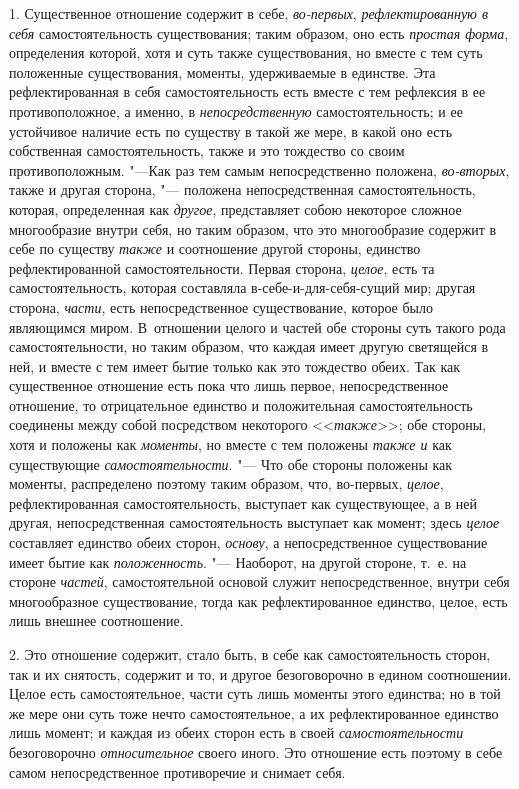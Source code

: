 1. Существенное отношение содержит в себе, {\em во-первых},
{\em рефлектированную в себя} самостоятельность
существования; таким образом, оно есть {\em простая
форма}, определения которой, хотя и суть также существования, но вместе с
тем суть положенные существования, моменты, удерживаемые в единстве. Эта
рефлектированная в себя самостоятельность есть вместе с тем рефлексия в ее
противоположное, а именно, в {\em непосредственную}
самостоятельность; и ее устойчивое наличие есть по существу в такой же
мере, в какой оно есть собственная самостоятельность, также и это тождество
со своим противоположным. "---Как раз тем самым непосредственно положена,
{\em во-вторых}, также и другая сторона, "--- положена
непосредственная самостоятельность, которая, определенная как
{\em другое}, представляет собою некоторое сложное
многообразие внутри себя, но таким образом, что это многообразие содержит в
себе по существу {\em также} и соотношение другой
стороны, единство рефлектированной самостоятельности. Первая сторона,
{\em целое}, есть та самостоятельность, которая
составляла в-себе-и-для-себя-сущий мир; другая сторона,
{\em части}, есть непосредственное существование,
которое было являющимся миром. В~отношении целого и частей обе стороны суть
такого рода самостоятельности, но таким образом, что каждая имеет другую
светящейся в ней, и вместе с тем имеет бытие только как это тождество
обеих. Так как существенное отношение есть пока что лишь первое,
непосредственное отношение, то отрицательное единство и положительная
самостоятельность соединены между собой посредством некоторого
<<{\em также}>>; обе стороны, хотя и положены как
{\em моменты}, но вместе с тем положены {\em также и} как существующие
{\em самостоятельности}. "--- Что обе стороны положены как
моменты, распределено поэтому таким образом, что, во-первых,
{\em целое}, рефлектированная самостоятельность,
выступает как существующее, а в ней другая, непосредственная
самостоятельность выступает как момент; здесь
{\em целое} составляет единство обеих сторон,
{\em основу}, а непосредственное существование имеет
бытие как {\em положенность}. "--- Наоборот, на другой
стороне, т.~е. на стороне {\em частей}, самостоятельной
основой служит непосредственное, внутри себя многообразное существование,
тогда как рефлектированное единство, целое, есть лишь внешнее соотношение.

2. Это отношение содержит, стало быть, в себе как самостоятельность сторон,
так и их снятость, содержит и то, и другое безоговорочно в едином
соотношении. Целое есть самостоятельное, части суть лишь моменты этого
единства; но в той же мере они суть тоже нечто самостоятельное, а их
рефлектированное единство лишь момент; и каждая из обеих сторон есть в
своей {\em самостоятельности} безоговорочно {\em относительное} своего
иного.
Это отношение есть поэтому в себе самом непосредственное противоречие и
снимает себя.

